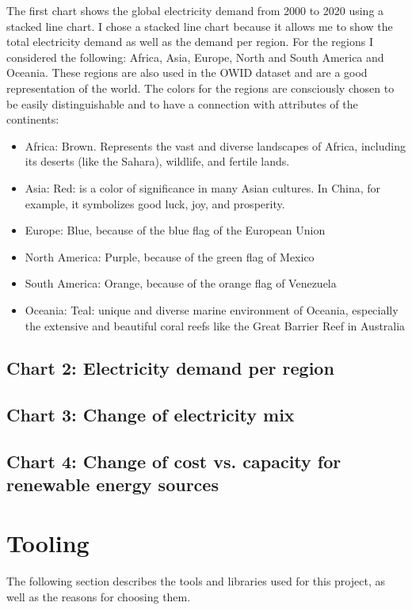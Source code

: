\documentclass{article}
\begin{document}
The first chart shows the global electricity demand from 2000 to 2020 using a stacked line chart.
I chose a stacked line chart because it allows me to show the total electricity demand as well as the demand per region.
For the regions I considered the following: Africa, Asia, Europe, North and South America and Oceania.
These regions are also used in the OWID dataset and are a good representation of the world.
The colors for the regions are consciously chosen to be easily distinguishable and to have a connection with attributes of the continents:
\begin{itemize}
    \item Africa: Brown. Represents the vast and diverse landscapes of Africa, including its deserts (like the Sahara), wildlife, and fertile lands.
    \item Asia: Red: is a color of significance in many Asian cultures. In China, for example, it symbolizes good luck, joy, and prosperity.
    \item Europe: Blue, because of the blue flag of the European Union
    \item North America: Purple, because of the green flag of Mexico
    \item South America: Orange, because of the orange flag of Venezuela
    \item Oceania: Teal: unique and diverse marine environment of Oceania, especially the extensive and beautiful coral reefs like the Great Barrier Reef in Australia
\end{itemize}


\subsection{Chart 2: Electricity demand per region}
\subsection{Chart 3: Change of electricity mix}
\subsection{Chart 4: Change of cost vs. capacity for renewable energy sources}

\newpage

\section{Tooling}

The following section describes the tools and libraries used for this project, as well as the reasons for choosing them.
\end{document}
